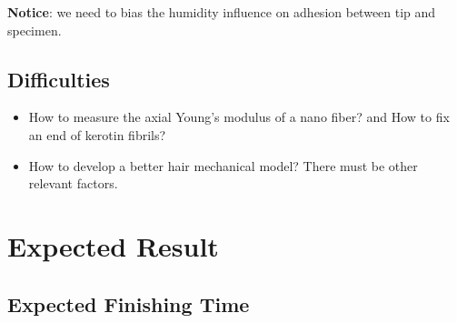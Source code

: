 \documentclass{article}
\begin{document}
\textbf{Notice}: we need to bias the humidity influence on adhesion between tip and specimen.

\subsection{Difficulties}
\begin{itemize}
    \item How to measure the axial Young's modulus of a nano fiber? and How to fix an end of kerotin fibrils?
    
    \item How to develop a better hair mechanical model? There must be other relevant factors.
\end{itemize}




\section{Expected Result}
\subsection{Expected Finishing Time}



\end{document}
